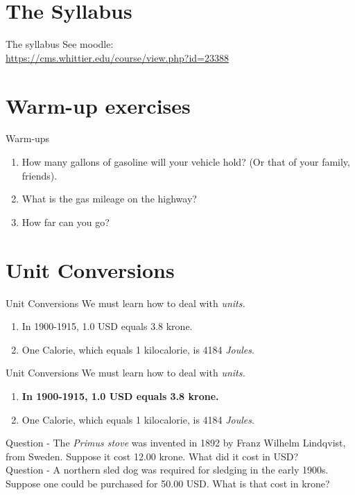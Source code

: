 \documentclass{beamer}
\begin{document}
\section{The Syllabus}

\begin{frame}{The syllabus}
\small
See moodle: \\ 
\url{https://cms.whittier.edu/course/view.php?id=23388}
\end{frame}

\section{Warm-up exercises}

\begin{frame}{Warm-ups}
\begin{enumerate}
\item How many gallons of gasoline will your vehicle hold?  (Or that of your family, friends).
\item What is the gas mileage on the highway?
\item How far can you go?
\end{enumerate}
\end{frame}

\section{Unit Conversions}

\begin{frame}{Unit Conversions}
We must learn how to deal with \textit{units.}
\begin{enumerate}
\item In 1900-1915, 1.0 USD equals 3.8 krone.
\item One Calorie, which equals 1 kilocalorie, is 4184 \textit{Joules}.
\end{enumerate}
\end{frame}

\begin{frame}{Unit Conversions}
\small
We must learn how to deal with \textit{units.}
\begin{enumerate}
\item \textbf{In 1900-1915, 1.0 USD equals 3.8 krone.}
\item One Calorie, which equals 1 kilocalorie, is 4184 \textit{Joules}.
\end{enumerate}
Question - The \textit{Primus stove} was invented in 1892 by Franz Wilhelm Lindqvist, from Sweden.  Suppose it cost 12.00 krone.  What did it cost in USD? \\ \vspace{0.5cm}
Question - A northern sled dog was required for sledging in the early 1900s.  Suppose one could be purchased for 50.00 USD.  What is that cost in krone? \\
\end{frame}
\end{document}
